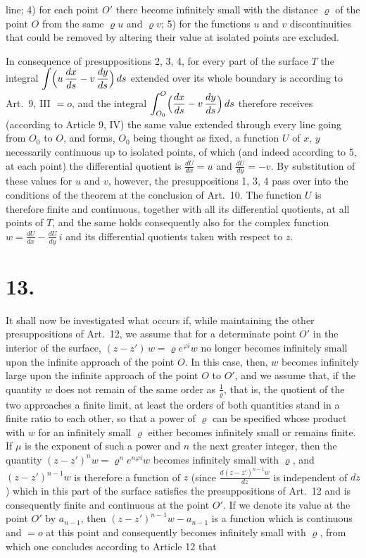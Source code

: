 \documentclass{article}
\begin{document}
line; 4) for each point $O'$ there become infinitely small with the distance $\varrho$ of the point $O$ from the same $\varrho u$ and $\varrho v$; 5) for the functions $u$ and $v$ discontinuities that could be removed by altering their value at isolated points are excluded.

In consequence of presuppositions 2, 3, 4, for every part of the surface $T$ the integral $\displaystyle\int \Bigl(u\,\frac{dx}{ds} - v\,\frac{dy}{ds}\Bigr)\,ds$ extended over its whole boundary is according to Art.~9, III $= o$, and the integral $\displaystyle\int_{O_0}^O \Bigl(\frac{dx}{ds} - v\,\frac{dy}{ds}\Bigr)\,ds$ therefore receives (according to Article 9, IV) the same value extended through every line going from $O_0$ to $O$, and forms, $O_0$ being thought as fixed, a function $U$ of $x$, $y$ necessarily continuous up to isolated points, of which (and indeed according to 5, at each point) the differential quotient is $\frac{dU}{dx} = u$ and $\frac{dU}{dy} = -v$. By substitution of these values for $u$ and $v$, however, the presuppositions 1, 3, 4 pass over into the conditions of the theorem at the conclusion of Art.~10. The function $U$ is therefore finite and continuous, together with all its differential quotients, at all points of $T$, and the same holds consequently also for the complex function $w = \frac{dU}{dx} - \frac{dU}{dy}\,i$ and its differential quotients taken with respect to $z$.

\section*{13.}

It shall now be investigated what occurs if, while maintaining the other presuppositions of Art.~12, we assume that for a determinate point $O'$ in the interior of the surface, $(z - z')\,w = \varrho e^{\varphi i}w$ no longer becomes infinitely small upon the infinite approach of the point $O$. In this case, then, $w$ becomes infinitely large upon the infinite approach of the point $O$ to $O'$, and we assume that, if the quantity $w$ does not remain of the same order as $\frac{1}{\varrho}$, that is, the quotient of the two approaches a finite limit, at least the orders of both quantities stand in a finite ratio to each other, so that a power of $\varrho$ can be specified whose product with $w$ for an infinitely small $\varrho$ either becomes infinitely small or remains finite. If $\mu$ is the exponent of such a power and $n$ the next greater integer, then the quantity $(z - z')^n w = \varrho^n e^{n\varphi i} w$ becomes infinitely small with $\varrho$, and $(z - z')^{n-1} w$ is therefore a function of $z$ (since $\frac{d(z - z')^{n-1} w}{dz}$ is independent of $dz$) which in this part of the surface satisfies the presuppositions of Art.~12 and is consequently finite and continuous at the point $O'$. If we denote its value at the point $O'$ by $a_{n-1}$, then $(z - z')^{n-1} w - a_{n-1}$ is a function which is continuous and $= o$ at this point and consequently becomes infinitely small with $\varrho$, from which one concludes according to Article 12 that
\end{document}
